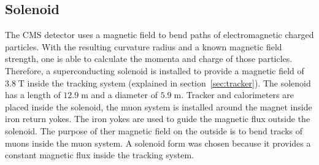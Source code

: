 \subsection{Solenoid}
	The CMS detector uses a magnetic field to bend paths of electromagnetic charged particles. With the resulting curvature radius and a known magnetic field strength, one is able to calculate the momenta and charge of those particles. Therefore, a superconducting solenoid is installed to provide a magnetic field of $3.8\;\text{T}$ inside the tracking system (explained in section~\ref{sec:tracker}). The solenoid has a length of $12.9\;\text{m}$ and a diameter of $5.9\;\text{m}$. Tracker and calorimeters are placed inside the solenoid, the muon system is installed around the magnet inside iron return yokes. The iron yokes are used to guide the magnetic flux outside the solenoid. The purpose of ther magnetic field on the outside is to bend tracks of muons inside the muon system. A solenoid form was chosen because it provides a constant magnetic flux inside the tracking system.
	

